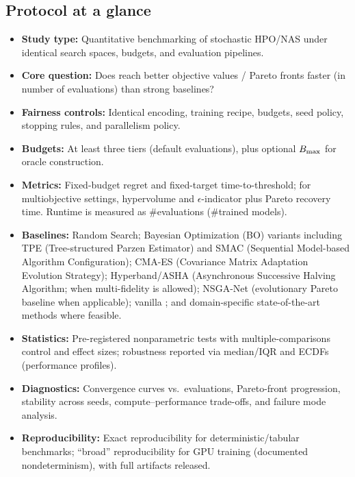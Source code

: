 \subsection*{Protocol at a glance}
\begin{itemize}
    \item \textbf{Study type:} Quantitative benchmarking of stochastic HPO/NAS under identical search spaces, budgets, and evaluation pipelines.

    \item \textbf{Core question:} Does \ProposedMethodName{} reach better objective values / Pareto fronts faster (in number of evaluations)
    than strong baselines?

    \item \textbf{Fairness controls:} Identical encoding, training recipe, budgets, seed policy, stopping rules, and parallelism policy.

    \item \textbf{Budgets:} At least three tiers (default \BudgetTiersText{} evaluations), plus optional \(B_{\max}\) for oracle construction.

    \item \textbf{Metrics:} Fixed-budget regret and fixed-target time-to-threshold; for multiobjective settings, hypervolume and
    \(\epsilon\)-indicator plus Pareto recovery time. Runtime is measured as \#evaluations (\#trained models).

    \item \textbf{Baselines:} Random Search; Bayesian Optimization (BO) variants including TPE (Tree-structured Parzen Estimator)
    and SMAC (Sequential Model-based Algorithm Configuration); CMA-ES (Covariance Matrix Adaptation Evolution Strategy);
    Hyperband/ASHA (Asynchronous Successive Halving Algorithm; when multi-fidelity is allowed); NSGA-Net (evolutionary Pareto baseline when applicable);
    vanilla \BackboneName{}; and domain-specific state-of-the-art methods where feasible.

    \item \textbf{Statistics:} Pre-registered nonparametric tests with multiple-comparisons control and effect sizes; robustness reported via
    median/IQR and ECDFs (performance profiles).

    \item \textbf{Diagnostics:} Convergence curves vs.\ evaluations, Pareto-front progression, stability across seeds, compute--performance trade-offs,
    and failure mode analysis.

    \item \textbf{Reproducibility:} Exact reproducibility for deterministic/tabular benchmarks; ``broad'' reproducibility for GPU training
    (documented nondeterminism), with full artifacts released.
\end{itemize}
